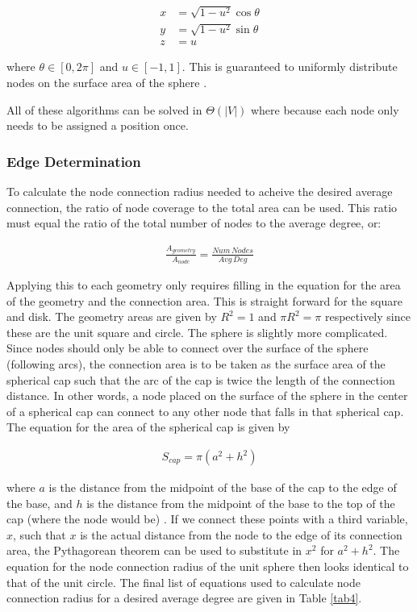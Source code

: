\documentclass{article}
\begin{document}
        \begin{align}
            x &= \sqrt{1-u^2}\cos\theta \\
            y &= \sqrt{1-u^2}\sin\theta \\
            z &= u
        \end{align}

        where $\theta \in [0,2\pi]$ and $u \in [-1,1]$. This is guaranteed to uniformly distribute nodes on the surface area of the sphere \cite{spherepoints}.
        \par
        All of these algorithms can be solved in $\Theta\left(|V|\right)$ where because each node only needs to be assigned a position once.

        \subsubsection{Edge Determination}
        To calculate the node connection radius needed to acheive the desired average connection, the ratio of node coverage to the total area can be used. This ratio must equal the ratio of the total number of nodes to the average degree, or:

        \begin{align}
            \frac{A_{geometry}}{A_{node}}= \frac{Num\,Nodes}{Avg\,Deg}
        \end{align}

        Applying this to each geometry only requires filling in the equation for the area of the geometry and the connection area. This is straight forward for the square and disk. The geometry areas are given by $R^2 = 1$ and $\pi R^2 = \pi$ respectively since these are the unit square and circle. The sphere is slightly more complicated. Since nodes should only be able to connect over the surface of the sphere (following arcs), the connection area is to be taken as the surface area of the spherical cap such that the arc of the cap is twice the length of the connection distance. In other words, a node placed on the surface of the sphere in the center of a spherical cap can connect to any other node that falls in that spherical cap. The equation for the area of the spherical cap is given by

        \begin{align}
            S_{cap} = \pi (a^2 + h^2)
        \end{align}

        where $a$ is the distance from the midpoint of the base of the cap to the edge of the base, and $h$ is the distance from the midpoint of the base to the top of the cap (where the node would be) \cite{spherecap}. If we connect these points with a third variable, $x$, such that $x$ is the actual distance from the node to the edge of its connection area, the Pythagorean theorem can be used to substitute in $x^2$ for $a^2 + h^2$. The equation for the node connection radius of the unit sphere then looks identical to that of the unit circle. The final list of equations used to calculate node connection radius for a desired average degree are given in Table \ref{tab4}.
\end{document}
